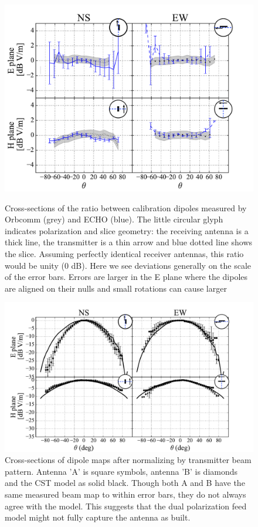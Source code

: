 \documentclass[preprint2,numberedappendix,tighten,twocolappendix]{aastex6}
\begin{document}
\begin{figure}
\begin{minipage}{0.45\textwidth}
\includegraphics[width=\columnwidth]{figures/GB_ratio_slice_5dB.pdf}
\caption{Cross-sections of the ratio between calibration dipoles measured by Orbcomm (grey) and ECHO (blue).    The little circular glyph indicates polarization and slice geometry: the receiving antenna is a thick line, the transmitter is a thin arrow and blue dotted line shows the slice.  Assuming perfectly identical receiver antennas, this ratio would be unity (0 dB). Here we see deviations generally on the scale of the error bars. Errors are larger in the E plane where the dipoles are aligned on their nulls and small rotations can cause larger \label{fig:GB_ratio_slices}}
\includegraphics[width=\columnwidth]{figures/GB_slices_quad.pdf}
\caption{Cross-sections of dipole maps after normalizing by transmitter beam pattern. Antenna 'A' is square symbols, antenna 'B' is diamonds and the CST model as solid black. Though both A and B have the same measured beam map to within error bars, they do not always agree with the model. This suggests that the dual polarization feed model might not fully capture the antenna as built.   }\label{fig:GB_slices_quad}
\end{minipage}\hfill
\end{figure}
\end{document}
